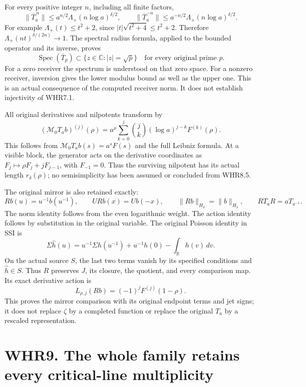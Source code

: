 For every positive integer \(n\), including all finite factors, \[
 \|\overline T_a^{\,n}\|
 \leq a^{n/2}\Lambda_+(n\log a)^{\delta/2},
 \qquad
 \|\overline T_a^{-n}\|
 \leq a^{-n/2}\Lambda_+(n\log a)^{\delta/2}.
 \tag{WHR8.4}
\] For example \(\Lambda_+(t)\leq t^2+2\), since
\(|t|\sqrt{t^2+4}\leq t^2+2\). Therefore
\(\Lambda_+(nt)^{\delta/(2n)}\to1\). The spectral radius formula,
applied to the bounded operator and its inverse, proves \[
 \boxed{\operatorname{Spec}(\overline T_p)
               \subset\{z\in\mathbb C:|z|=\sqrt p\}}
 \quad\text{for every original prime }p.
 \tag{WHR8.5}
\] For a zero receiver the spectrum is understood on that zero space.
For a nonzero receiver, inversion gives the lower modulus bound as well
as the upper one. This is an actual consequence of the computed receiver
norm. It does not establish injectivity of WHR7.1.

All original derivatives and nilpotents transform by \[
 (\mathcal M_0T_ab)^{(j)}(\rho)
 =a^\rho\sum_{k=0}^j\binom jk(\log a)^{j-k}F^{(k)}(\rho).
 \tag{WHR8.6}
\] This follows from \(\mathcal M_0T_ab(s)=a^sF(s)\) and the full
Leibniz formula. At a visible block, the generator acts on the
derivative coordinates as \(F_j\mapsto\rho F_j+jF_{j-1}\), with
\(F_{-1}=0\). Thus the surviving nilpotent has its actual length
\(r_\delta(\rho)\); no semisimplicity has been assumed or concluded from
WHR8.5.

The original mirror is also retained exactly: \[
 Rb(u)=u^{-1}b(u^{-1}),\qquad URb(x)=Ub(-x),\qquad
 \|Rb\|_{H_\delta}=\|b\|_{H_\delta},\qquad
 RT_aR=aT_{a^{-1}}.
 \tag{WHR8.7}
\] The norm identity follows from the even logarithmic weight. The
action identity follows by substitution in the original variable. The
original Poisson identity in SSI is \[
 \Sigma\widehat h(u)=u^{-1}\Sigma h(u^{-1})
               +u^{-1}h(0)-\int_{\mathbb R}h(v)\,dv.
\] On the actual source \(S\), the last two terms vanish by its
specified conditions and \(\widehat h\in S\). Thus \(R\) preserves
\(J\), its closure, the quotient, and every comparison map. Its exact
derivative action is \[
 L_{\rho,j}(Rb)=(-1)^jF^{(j)}(1-\rho).
 \tag{WHR8.8}
\] This proves the mirror comparison with its original endpoint terms
and jet signs; it does not replace \(\zeta\) by a completed function or
replace the original \(T_a\) by a rescaled representation.

\section{WHR9. The whole family retains every critical-line
multiplicity}\label{whr9.-the-whole-family-retains-every-critical-line-multiplicity}


